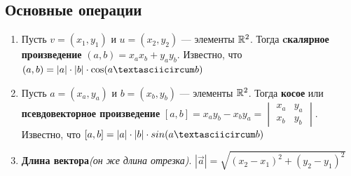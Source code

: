 \subsection*{Основные операции}
\begin{enumerate}
    \item \Def Пусть $v = (x_1, y_1)$ и $u = (x_2, y_2)$ — элементы $\mathbb{R}^2$. Тогда \textbf{cкалярное произведение} $(a, b) = x_ax_b + y_ay_b$. Известно, что $(a, b) = |a|\cdot|b|\cdot \cos(a \textasciicircum b)$
    \item \Def Пусть $a = (x_a, y_a)$ и $b = (x_b, y_b)$ — элементы $\mathbb{R}^2$. Тогда \textbf{косое} или \textbf{псевдовекторное произведение} $[a, b] = x_ay_b - x_by_a = \begin{vmatrix}
        x_a & y_a \\
        x_b & y_b 
    \end{vmatrix}$. Известно, что $[a, b] = |a|\cdot|b|\cdot sin (a \textasciicircum b)$
    \item \textbf{Длина вектора}\textit{(он же длина отрезка)}. $|\Vec{a}| = \sqrt{(x_2 - x_1)^2 + (y_2 - y_1)^2}$
\end{enumerate}

